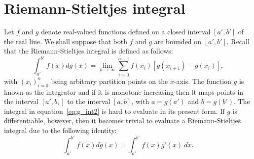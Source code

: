\documentclass[twoside,reqno,11pt]{fcaa-var} %
\begin{document}
\section{Riemann-Stieltjes integral}
\label{sec:rs}
\noindent
Let $f$ and $g$ denote real-valued functions defined on a closed interval $[a',b']$ of the real line. We shall suppose that both $f$ and $g$ are bounded on $[a',b']$. Recall that the Riemann-Stieltjes integral is defined as follows:
\begin{equation}
\label{eq:g_int2}
\int_{a'}^{b'} f(x) dg(x) =  \lim_{n \rightarrow \infty}\sum_{i=0}^{n-1} f(x_i)[g(x_{i+1})-g(x_{i})], 
\end{equation}
with $(x_i)_{i=0}^n$ being arbitrary partition points on the $x$-axis. 
The function $g$ is known as the integrator and if it is monotone increasing then it maps points in the interval $[a',b,]$ to the interval $[a,b]$, with $a = g(a')$ and $b = g(b')$. The integral in equation~\eqref{eq:g_int2} is hard to evaluate in its present form. If $g$ is differentiable, however, then it becomes trivial to 
evaluate a Riemann-Stieltjes integral due to the following identity:
\begin{equation}
\label{eq:rs_identity}
\int_{a'}^{b'} f(x) dg(x) = \int_{a'}^{b'} f(x)g'(x)~dx.
\end{equation}
\end{document}
